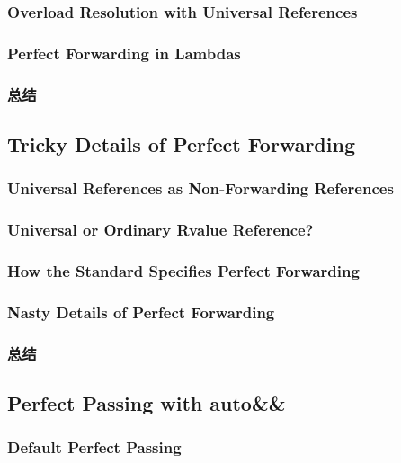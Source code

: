\documentclass[11pt,a4paper,UTF8]{ctexart}
\begin{document}
		\subsubsection{Overload Resolution with Universal References}
		\subsubsection{Perfect Forwarding in Lambdas}
		\subsubsection{总结}
	\subsection{Tricky Details of Perfect Forwarding}
		\subsubsection{Universal References as Non-Forwarding References}
		\subsubsection{Universal or Ordinary Rvalue Reference?}
		\subsubsection{How the Standard Specifies Perfect Forwarding}
		\subsubsection{Nasty Details of Perfect Forwarding}
		\subsubsection{总结}
	\subsection{Perfect Passing with auto\&\&}
		\subsubsection{Default Perfect Passing}
\end{document}
